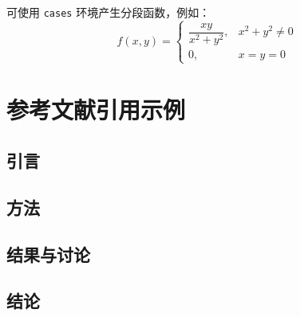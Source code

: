 \documentclass{mySimpleArticleCN}
\begin{document}
    可使用 \verb|cases| 环境产生分段函数，例如：
    \begin{equation}
        f(x,y)=
        \begin{cases}
        \dfrac{xy}{x^2+y^2}, & x^2+y^2 \neq 0 \\
        0, & x=y=0
        \end{cases}
    \end{equation}


    \section{参考文献引用示例}
        \subsection{引言}

        \lipsum[1]\cite{jack1971,lieberman1989}

        \lipsum[3]\cite{sander1969}

        \subsection{方法}

        \lipsum[4]\cite{Powis2024,Sun2023a}

        \subsection{结果与讨论}

        \lipsum[5-6]\citep{Lopez2013, Falgout2002a}

        \lipsum[7]\citep{Donko2021}

        \subsection{结论}

        \lipsum[8]

\newpage

\end{document}
